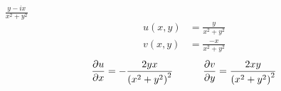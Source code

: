 \item[24.] $\frac{y - ix}{x^2 + y^2}$
\begin{align*}
    u(x,y) &= \frac{y}{x^2 + y^2} \\
    v(x,y) &= \frac{-x}{x^2 + y^2}
\end{align*}
\begin{align*}
    \frac{\partial u}{\partial x}  &= -\frac{2yx}{\left(x^2+y^2\right)^2} 
    &\qquad 
    \frac{\partial v}{\partial y}  &= \frac{2xy}{\left(x^2+y^2\right)^2} \\
\end{align*}
